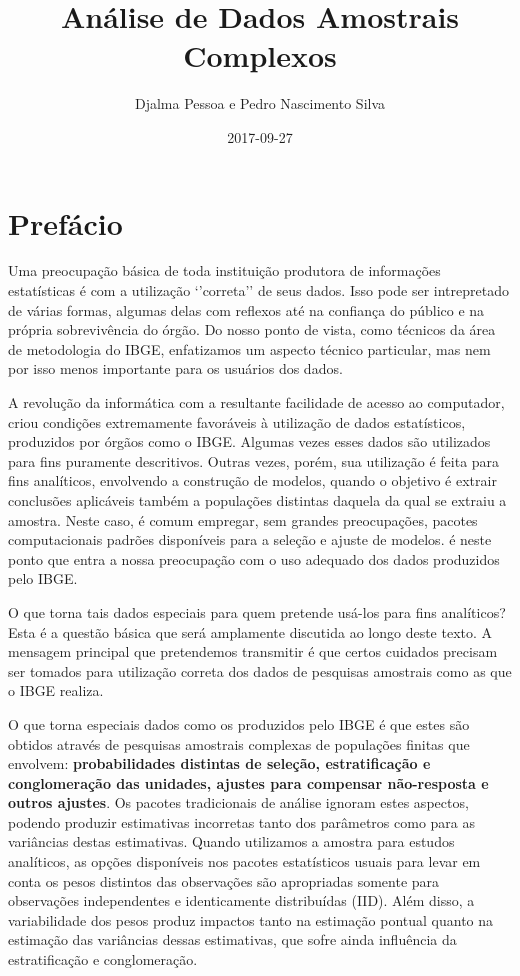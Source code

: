 \documentclass[]{book}
\title{Análise de Dados Amostrais Complexos}
\author{Djalma Pessoa e Pedro Nascimento Silva}
\date{2017-09-27}
\theoremstyle{definition}
\theoremstyle{definition}
\theoremstyle{definition}
\theoremstyle{remark}
\begin{document}
\maketitle

{
\setcounter{tocdepth}{1}
\tableofcontents
}
\chapter*{Prefácio}\label{prefacio}

Uma preocupação básica de toda instituição produtora de informações
estatísticas é com a utilização `'correta'' de seus dados. Isso pode ser
intrepretado de várias formas, algumas delas com reflexos até na
confiança do público e na própria sobrevivência do órgão. Do nosso ponto
de vista, como técnicos da área de metodologia do IBGE, enfatizamos um
aspecto técnico particular, mas nem por isso menos importante para os
usuários dos dados.

A revolução da informática com a resultante facilidade de acesso ao
computador, criou condições extremamente favoráveis à utilização de
dados estatísticos, produzidos por órgãos como o IBGE. Algumas vezes
esses dados são utilizados para fins puramente descritivos. Outras
vezes, porém, sua utilização é feita para fins analíticos, envolvendo a
construção de modelos, quando o objetivo é extrair conclusões aplicáveis
também a populações distintas daquela da qual se extraiu a amostra.
Neste caso, é comum empregar, sem grandes preocupações, pacotes
computacionais padrões disponíveis para a seleção e ajuste de modelos. é
neste ponto que entra a nossa preocupação com o uso adequado dos dados
produzidos pelo IBGE.

O que torna tais dados especiais para quem pretende usá-los para fins
analíticos? Esta é a questão básica que será amplamente discutida ao
longo deste texto. A mensagem principal que pretendemos transmitir é que
certos cuidados precisam ser tomados para utilização correta dos dados
de pesquisas amostrais como as que o IBGE realiza.

O que torna especiais dados como os produzidos pelo IBGE é que estes são
obtidos através de pesquisas amostrais complexas de populações finitas
que envolvem: \textbf{probabilidades distintas de seleção,
estratificação e conglomeração das unidades, ajustes para compensar
não-resposta e outros ajustes}. Os pacotes tradicionais de análise
ignoram estes aspectos, podendo produzir estimativas incorretas tanto
dos parâmetros como para as variâncias destas estimativas. Quando
utilizamos a amostra para estudos analíticos, as opções disponíveis nos
pacotes estatísticos usuais para levar em conta os pesos distintos das
observações são apropriadas somente para observações independentes e
identicamente distribuídas (IID). Além disso, a variabilidade dos pesos
produz impactos tanto na estimação pontual quanto na estimação das
variâncias dessas estimativas, que sofre ainda influência da
estratificação e conglomeração.
\end{document}
